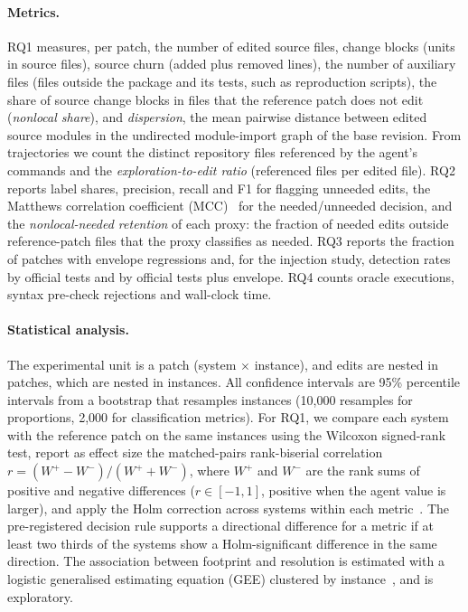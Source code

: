 \documentclass[a4paper,fleqn]{cas-sc}
\begin{document}
\paragraph{Metrics.} RQ1 measures, per patch, the number of edited source files, change blocks (units in source files), source churn (added plus removed lines), the number of auxiliary files (files outside the package and its tests, such as reproduction scripts), the share of source change blocks in files that the reference patch does not edit (\emph{nonlocal share}), and \emph{dispersion}, the mean pairwise distance between edited source modules in the undirected module-import graph of the base revision. From trajectories we count the distinct repository files referenced by the agent's commands and the \emph{exploration-to-edit ratio} (referenced files per edited file). RQ2 reports label shares, precision, recall and F1 for flagging unneeded edits, the Matthews correlation coefficient (MCC)~\citep{chicco2020mcc} for the needed/unneeded decision, and the \emph{nonlocal-needed retention} of each proxy: the fraction of needed edits outside reference-patch files that the proxy classifies as needed. RQ3 reports the fraction of patches with envelope regressions and, for the injection study, detection rates by official tests and by official tests plus envelope. RQ4 counts oracle executions, syntax pre-check rejections and wall-clock time.

\paragraph{Statistical analysis.} The experimental unit is a patch (system $\times$ instance), and edits are nested in patches, which are nested in instances. All confidence intervals are 95\% percentile intervals from a bootstrap that resamples instances (10{,}000 resamples for proportions, 2{,}000 for classification metrics). For RQ1, we compare each system with the reference patch on the same instances using the Wilcoxon signed-rank test, report as effect size the matched-pairs rank-biserial correlation $r=(W^{+}-W^{-})/(W^{+}+W^{-})$, where $W^{+}$ and $W^{-}$ are the rank sums of positive and negative differences ($r\in[-1,1]$, positive when the agent value is larger), and apply the Holm correction across systems within each metric~\citep{holm1979}. The pre-registered decision rule supports a directional difference for a metric if at least two thirds of the systems show a Holm-significant difference in the same direction. The association between footprint and resolution is estimated with a logistic generalised estimating equation (GEE) clustered by instance~\citep{liang1986gee}, and is exploratory.
\end{document}
